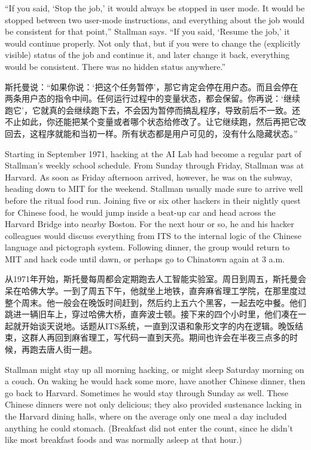 \ifdefined\eng
``If you said, `Stop the job,' it would always be stopped in user mode. It would be stopped between two user-mode instructions, and everything about the job would be consistent for that point,'' Stallman says. ``If you said, `Resume the job,' it would continue properly. Not only that, but if you were to change the (explicitly visible) status of the job and continue it, and later change it back, everything would be consistent. There was no hidden status anywhere.''
\fi

\ifdefined\chs
斯托曼说：``如果你说：`把这个任务暂停'，那它肯定会停在用户态。而且会停在两条用户态的指令中间。任何运行过程中的变量状态，都会保留。你再说：`继续跑它'，它就真的会继续跑下去，不会因为暂停而搞乱程序，导致前后不一致。还不止如此，你还能把某个变量或者哪个状态给修改了。让它继续跑，然后再把它改回去，这程序就能和当初一样。所有状态都是用户可见的，没有什么隐藏状态。''
\fi

\ifdefined\eng
Starting in September 1971, hacking at the AI Lab had become a regular part of Stallman's weekly school schedule. From Sunday through Friday, Stallman was at Harvard. As soon as Friday afternoon arrived, however, he was on the subway, heading down to MIT for the weekend. Stallman usually made sure to arrive well before the ritual food run. Joining five or six other hackers in their nightly quest for Chinese food, he would jump inside a beat-up car and head across the Harvard Bridge into nearby Boston. For the next hour or so, he and his hacker colleagues would discuss everything from ITS to the internal logic of the Chinese language and pictograph system. Following dinner, the group would return to MIT and hack code until dawn, or perhaps go to Chinatown again at 3 a.m.
\fi

\ifdefined\chs
从1971年开始，斯托曼每周都会定期跑去人工智能实验室。周日到周五，斯托曼会呆在哈佛大学。一到了周五下午，他就坐上地铁，直奔麻省理工学院，在那里度过整个周末。他一般会在晚饭时间赶到，然后约上五六个黑客，一起去吃中餐。他们跳进一辆旧车上，穿过哈佛大桥，直奔波士顿。接下来的四个小时里，他们凑在一起就开始谈天说地。话题从ITS系统，一直到汉语和象形文字的内在逻辑。晚饭结束，这群人再回到麻省理工，写代码一直到天亮。期间也许会在半夜三点多的时候，再跑去唐人街一趟。
\fi

\ifdefined\eng
Stallman might stay up all morning hacking, or might sleep Saturday morning on a couch. On waking he would hack some more, have another Chinese dinner, then go back to Harvard.  Sometimes he would stay through Sunday as well.  These Chinese dinners were not only delicious; they also provided sustenance lacking in the Harvard dining halls, where on the average only one meal a day included anything he could stomach. (Breakfast did not enter the count, since he didn't like most breakfast foods and was normally asleep at that hour.)
\fi

